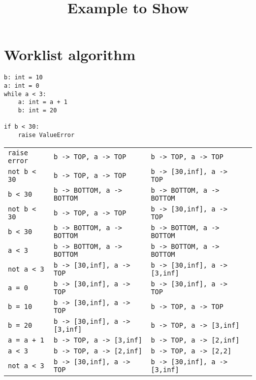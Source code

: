 \documentclass[11pt]{article}
\newcounter{rowcount}
\begin{document}
\title{Example to Show}

\maketitle


\section{Worklist algorithm}

\begin{lstlisting}
b: int = 10
a: int = 0
while a < 3:
    a: int = a + 1
    b: int = 20

if b < 30:
    raise ValueError
\end{lstlisting}
\begin{tabular}{@{\stepcounter{rowcount}\therowcount.)\hspace*{\tabcolsep}}llll}
 \verb|raise error| & \verb|b -> TOP, a -> TOP| & \verb|b -> TOP, a -> TOP| \\
 \verb|not b < 30| & \verb|b -> TOP, a -> TOP| & \verb|b -> [30,inf], a -> TOP| \\
 \verb|b < 30| & \verb|b -> BOTTOM, a -> BOTTOM| & \verb|b -> BOTTOM, a -> BOTTOM| \\
 \verb|not b < 30| & \verb|b -> TOP, a -> TOP| & \verb|b -> [30,inf], a -> TOP| \\
 \verb|b < 30| & \verb|b -> BOTTOM, a -> BOTTOM| & \verb|b -> BOTTOM, a -> BOTTOM| \\
 \verb|a < 3| & \verb|b -> BOTTOM, a -> BOTTOM| & \verb|b -> BOTTOM, a -> BOTTOM| \\
 \verb|not a < 3| & \verb|b -> [30,inf], a -> TOP| & \verb|b -> [30,inf], a -> [3,inf]| \\
 \verb|a = 0| & \verb|b -> [30,inf], a -> TOP| & \verb|b -> [30,inf], a -> TOP| \\
 \verb|b = 10| & \verb|b -> [30,inf], a -> TOP| & \verb|b -> TOP, a -> TOP| \\
 \verb|b = 20| & \verb|b -> [30,inf], a -> [3,inf]| & \verb|b -> TOP, a -> [3,inf]| \\
 \verb|a = a + 1| & \verb|b -> TOP, a -> [3,inf]| & \verb|b -> TOP, a -> [2,inf]| \\
 \verb|a < 3| & \verb|b -> TOP, a -> [2,inf]| & \verb|b -> TOP, a -> [2,2]| \\
 \verb|not a < 3| & \verb|b -> [30,inf], a -> TOP| & \verb|b -> [30,inf], a -> [3,inf]| \\

\end{tabular}
\end{document}
